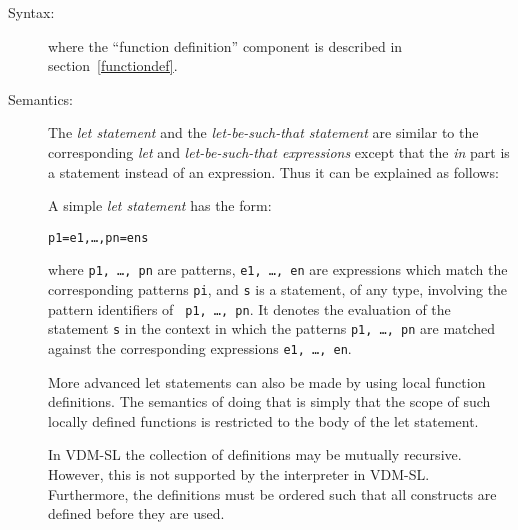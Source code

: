\documentclass[\pformat,12pt]{article}
\begin{document}
\begin{description}
\item[Syntax:]





  where the ``function definition'' component is described in
  section~\ref{functiondef}.

\item[Semantics:] The {\it let statement} and the {\it let-be-such-that
    statement} are similar to the corresponding {\it let} and {\it
    let-be-such-that expressions} except that the {\it in} part is a
  statement instead of an expression. Thus it can be explained as follows:

  A simple {\it let statement} has the form:
  \begin{alltt}
     p1 = e1, \ldots, pn = en  s
  \end{alltt}
  where {\tt p1, \ldots, pn} are patterns, {\tt e1, \ldots, en} are
  expressions which match the corresponding patterns {\tt pi}, and {\tt s}
  is a statement, of any type, involving the pattern identifiers of {\tt
    p1, \ldots, pn}. It denotes the evaluation of the statement {\tt s} in
  the context in which the patterns {\tt p1, \ldots, pn} are matched
  against the corresponding expressions {\tt e1, \ldots, en}.

  More advanced let statements can also be made by using local function
  definitions. The semantics of doing that is simply that the scope of such
  locally defined functions is restricted to the body of the let statement.

  In VDM-SL the collection of definitions may be mutually recursive.
  However, this is not supported by the interpreter in  VDM-SL.
  Furthermore, the definitions must be ordered such that
  all constructs are defined before they are used.


\end{description}
\end{document}
